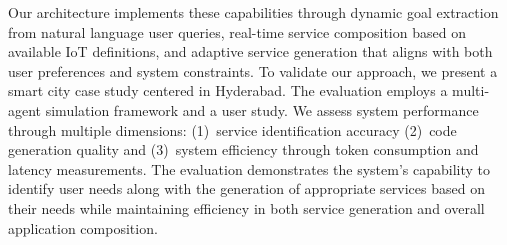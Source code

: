 Our architecture implements these capabilities through dynamic goal extraction from natural language user queries, real-time service composition based on available IoT definitions, and adaptive service generation that aligns with both user preferences and system constraints. To validate our approach, we present a smart city case study centered in Hyderabad. The evaluation employs a multi-agent simulation framework and a user study. We assess system performance through multiple dimensions: (1)~service identification accuracy (2)~code generation quality and (3)~system efficiency through token consumption and latency measurements. The evaluation demonstrates the system's capability to identify user needs along with the generation of appropriate services based on their needs while maintaining efficiency in both service generation and overall application composition.